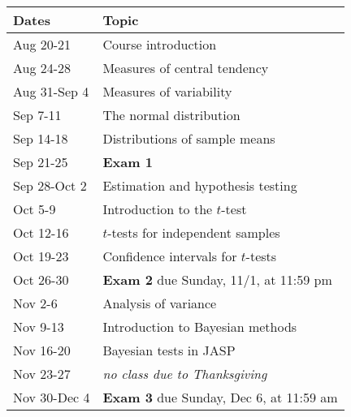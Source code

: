 \documentclass[10pt]{article}
\begin{document}
\begin{center}
\begin{tabular}{ll}
Dates & Topic\\
\hline
Aug 20-21 & Course introduction\\
Aug 24-28 & Measures of central tendency\\
Aug 31-Sep 4 & Measures of variability\\
Sep 7-11 & The normal distribution\\
Sep 14-18 & Distributions of sample means\\
Sep 21-25 & \textbf{Exam 1}\\
Sep 28-Oct 2 & Estimation and hypothesis testing\\
Oct 5-9 & Introduction to the \(t\)-test\\
Oct 12-16 & \(t\)-tests for independent samples\\
Oct 19-23 & Confidence intervals for \(t\)-tests\\
Oct 26-30 & \textbf{Exam 2} due Sunday, 11/1, at 11:59 pm\\
Nov 2-6 & Analysis of variance\\
Nov 9-13 & Introduction to Bayesian methods\\
Nov 16-20 & Bayesian tests in JASP\\
Nov 23-27 & \emph{no class due to Thanksgiving}\\
Nov 30-Dec 4 & \textbf{Exam 3} due Sunday, Dec 6, at 11:59 am\\
\end{tabular}
\end{center}
\end{document}
